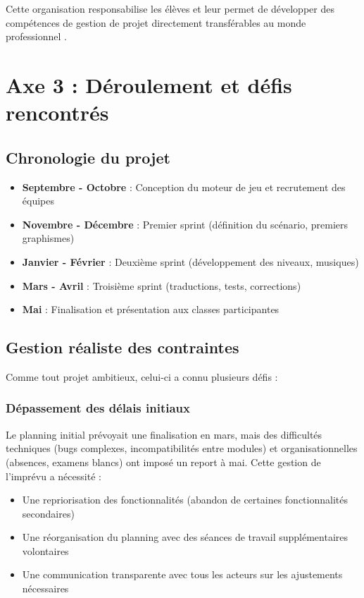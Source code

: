 Cette organisation responsabilise les élèves et leur permet de développer des compétences de gestion de projet directement transférables au monde professionnel \parencite{projet_travail_groupe}.

\section{Axe 3 : Déroulement et défis rencontrés}

\subsection{Chronologie du projet}

\begin{itemize}[leftmargin=*]
    \item \textbf{Septembre - Octobre} : Conception du moteur de jeu et recrutement des équipes
    \item \textbf{Novembre - Décembre} : Premier sprint (définition du scénario, premiers graphismes)
    \item \textbf{Janvier - Février} : Deuxième sprint (développement des niveaux, musiques)
    \item \textbf{Mars - Avril} : Troisième sprint (traductions, tests, corrections)
    \item \textbf{Mai} : Finalisation et présentation aux classes participantes
\end{itemize}

\subsection{Gestion réaliste des contraintes}

Comme tout projet ambitieux, celui-ci a connu plusieurs défis \parencite{projet_travail_groupe,competences_transversales} :

\subsubsection{Dépassement des délais initiaux}
Le planning initial prévoyait une finalisation en mars, mais des difficultés techniques (bugs complexes, incompatibilités entre modules) et organisationnelles (absences, examens blancs) ont imposé un report à mai. Cette gestion de l'imprévu a nécessité :
\begin{itemize}[leftmargin=*]
    \item Une repriorisation des fonctionnalités (abandon de certaines fonctionnalités secondaires)
    \item Une réorganisation du planning avec des séances de travail supplémentaires volontaires
    \item Une communication transparente avec tous les acteurs sur les ajustements nécessaires
\end{itemize}

